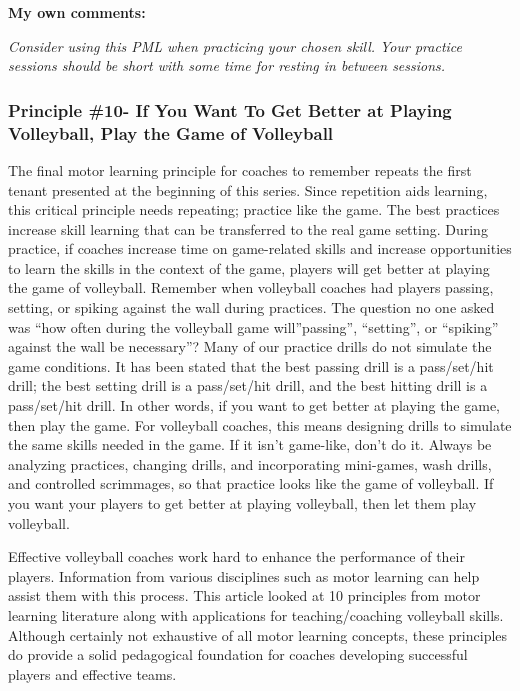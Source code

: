 \documentclass[
  letterpaper,
  DIV=11,
  numbers=noendperiod]{scrartcl}
\begin{document}
\textbf{My own comments:}

\emph{Consider using this PML when practicing your chosen skill. Your
practice sessions should be short with some time for resting in between
sessions.}

\hypertarget{principle-10--if-you-want-to-get-better-at-playing-volleyball-play-the-game-of-volleyball}{%
\subsubsection{\texorpdfstring{\textbf{Principle \#10- If You Want To
Get Better at Playing Volleyball, Play the Game of
Volleyball}}{Principle \#10- If You Want To Get Better at Playing Volleyball, Play the Game of Volleyball}}\label{principle-10--if-you-want-to-get-better-at-playing-volleyball-play-the-game-of-volleyball}}

The final motor learning principle for coaches to remember repeats the
first tenant presented at the beginning of this series. Since repetition
aids learning, this critical principle needs repeating; practice like
the game. The best practices increase skill learning that can be
transferred to the real game setting. During practice, if coaches
increase time on game-related skills and increase opportunities to learn
the skills in the context of the game, players will get better at
playing the game of volleyball. Remember when volleyball coaches had
players passing, setting, or spiking against the wall during practices.
The question no one asked was ``how often during the volleyball game
will''passing'', ``setting'', or ``spiking'' against the wall be
necessary''? Many of our practice drills do not simulate the game
conditions. It has been stated that the best passing drill is a
pass/set/hit drill; the best setting drill is a pass/set/hit drill, and
the best hitting drill is a pass/set/hit drill. In other words, if you
want to get better at playing the game, then play the game. For
volleyball coaches, this means designing drills to simulate the same
skills needed in the game. If it isn't game-like, don't do it. Always be
analyzing practices, changing drills, and incorporating mini-games, wash
drills, and controlled scrimmages, so that practice looks like the game
of volleyball. If you want your players to get better at playing
volleyball, then let them play volleyball.

Effective volleyball coaches work hard to enhance the performance of
their players. Information from various disciplines such as motor
learning can help assist them with this process. This article looked at
10 principles from motor learning literature along with applications for
teaching/coaching volleyball skills. Although certainly not exhaustive
of all motor learning concepts, these principles do provide a solid
pedagogical foundation for coaches developing successful players and
effective teams.
\end{document}
